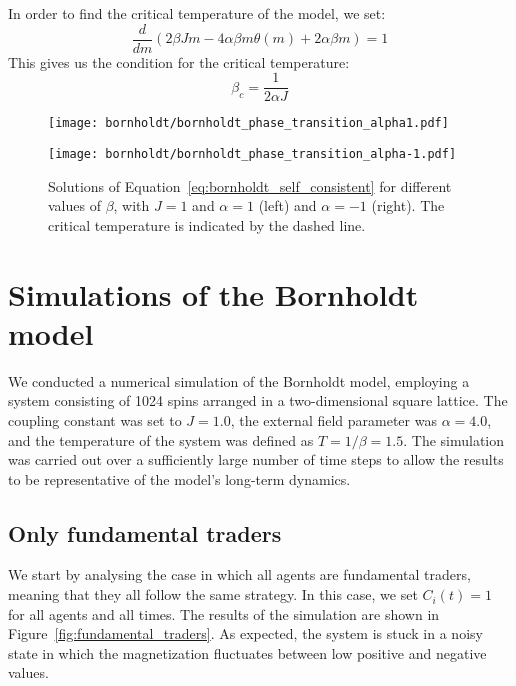 In order to find the critical temperature of the model, we set:
\begin{equation}
    \frac{d}{d m}\left(2\beta J m - 4 \alpha \beta m \theta(m) + 2\alpha \beta m\right) = 1
\end{equation}
This gives us the condition for the critical temperature:
\begin{equation}
    \beta_c = \frac{1}{2\alpha J}
\end{equation}


\begin{figure}[H]
    \centering
    \begin{minipage}[t]{0.45\textwidth}
        \centering
        \texttt{[image: bornholdt/bornholdt\_phase\_transition\_alpha1.pdf]}

    \end{minipage}
    \hfill
    \begin{minipage}[t]{0.45\textwidth}
        \centering
        \texttt{[image: bornholdt/bornholdt\_phase\_transition\_alpha-1.pdf]}
    \end{minipage}
    \caption{Solutions of Equation~\ref{eq:bornholdt_self_consistent} for different values of $\beta$, with $J=1$ and $\alpha=1$ (left) and $\alpha=-1$ (right). The critical temperature is indicated by the dashed line.}
    \label{fig:bornholdt_phase_transition}
\end{figure}
\newpage

\section{Simulations of the Bornholdt model}
We conducted a numerical simulation of the Bornholdt model, employing a system consisting of 1024 spins arranged in a two-dimensional square lattice. The coupling constant was set to $J=1.0$, the external field parameter was $\alpha=4.0$, and the temperature of the system was defined as $T=1/\beta=1.5$. The simulation was carried out over a sufficiently large number of time steps to allow the results to be representative of the model's long-term dynamics.

\subsection{Only fundamental traders}
We start by analysing the case in which all agents are fundamental traders, meaning that they all follow the same strategy. In this case, we set $C_i(t) = 1$ for all agents and all times. The results of the simulation are shown in Figure~\ref{fig:fundamental_traders}. As expected, the system is stuck in a noisy state in which the magnetization fluctuates between low positive and negative values.

